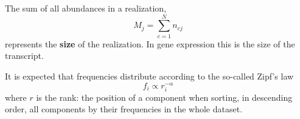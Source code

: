 The sum of all abundances in a realization,
\begin{equation}\label{eq:size}
M_j=\sum_{c=1}^{N}n_{cj}
\end{equation}
represents the \textbf{size} of the realization. In gene expression this is the size of the transcript.

It is expected that frequencies distribute according to the so-called Zipf's law
\begin{equation}\label{eq:zipf}
f_i\propto r_i^{-\alpha}
\end{equation}
where $r$ is the rank: the position of a component when sorting, in descending order, all components by their frequencies in the whole dataset.